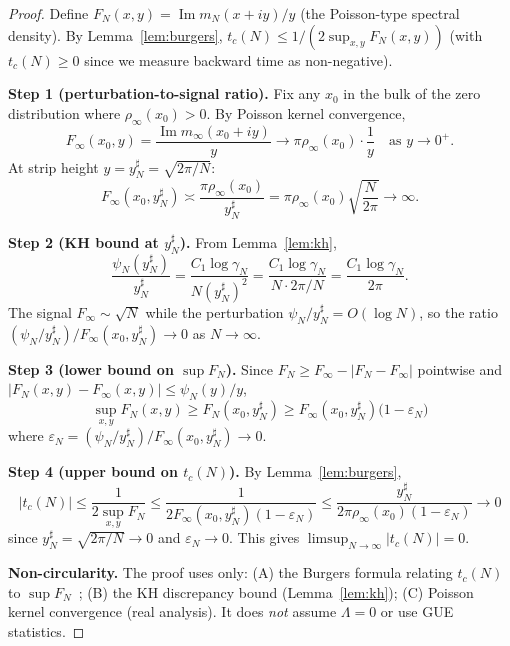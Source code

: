 \documentclass[11pt,reqno]{amsart}
\newcommand{\Lam}{\Lambda}
\newcommand{\tc}{t_c}
\newcommand{\mN}{m_N}
\newcommand{\minf}{m_\infty}
\newcommand{\gN}{\gamma_N}
\newcommand{\yN}{y_N^{\sharp}}
\begin{document}
\begin{proof}
Define $F_N(x,y) = \operatorname{Im}\mN(x+iy)/y$
(the Poisson-type spectral density).
By Lemma~\ref{lem:burgers}, $\tc(N) \leq 1/(2\sup_{x,y} F_N(x,y))$
(with $\tc(N) \geq 0$ since we measure backward time as non-negative).

\textbf{Step 1 (perturbation-to-signal ratio).}
Fix any $x_0$ in the bulk of the zero distribution where $\rho_\infty(x_0) > 0$.
By Poisson kernel convergence,
\begin{equation}
  F_\infty(x_0, y) = \frac{\operatorname{Im}\minf(x_0+iy)}{y}
  \to \pi\rho_\infty(x_0) \cdot \frac{1}{y}
  \quad\text{as }y\to 0^+.
\end{equation}
At strip height $y = \yN = \sqrt{2\pi/N}$:
\begin{equation}\label{eq:Finf}
  F_\infty(x_0, \yN) \asymp \frac{\pi\rho_\infty(x_0)}{\yN}
  = \pi\rho_\infty(x_0)\sqrt{\frac{N}{2\pi}} \to \infty.
\end{equation}

\textbf{Step 2 (KH bound at $\yN$).}
From Lemma~\ref{lem:kh},
\begin{equation}
  \frac{\psi_N(\yN)}{\yN}
  = \frac{C_1\log\gN}{N(\yN)^2}
  = \frac{C_1\log\gN}{N \cdot 2\pi/N}
  = \frac{C_1\log\gN}{2\pi}.
\end{equation}
The signal $F_\infty \sim \sqrt{N}$ while the perturbation $\psi_N/\yN = O(\log N)$,
so the ratio $(\psi_N/\yN)/F_\infty(x_0,\yN) \to 0$ as $N\to\infty$.

\textbf{Step 3 (lower bound on $\sup F_N$).}
Since $F_N \geq F_\infty - |F_N - F_\infty|$ pointwise and
$|F_N(x,y) - F_\infty(x,y)| \leq \psi_N(y)/y$,
\begin{equation}
  \sup_{x,y} F_N(x,y) \geq F_N(x_0,\yN)
  \geq F_\infty(x_0,\yN)\bigl(1 - \varepsilon_N\bigr)
\end{equation}
where $\varepsilon_N = (\psi_N/\yN)/F_\infty(x_0,\yN) \to 0$.

\textbf{Step 4 (upper bound on $\tc(N)$).}
By Lemma~\ref{lem:burgers},
\begin{equation}
  |\tc(N)| \leq \frac{1}{2\sup_{x,y}F_N}
  \leq \frac{1}{2F_\infty(x_0,\yN)(1-\varepsilon_N)}
  \leq \frac{\yN}{2\pi\rho_\infty(x_0)(1-\varepsilon_N)} \to 0
\end{equation}
since $\yN = \sqrt{2\pi/N} \to 0$ and $\varepsilon_N \to 0$.
This gives $\limsup_{N\to\infty}|\tc(N)| = 0$.

\textbf{Non-circularity.}
The proof uses only:
(A) the Burgers formula relating $\tc(N)$ to $\sup F_N$~\cite{polymath15};
(B) the KH discrepancy bound (Lemma~\ref{lem:kh});
(C) Poisson kernel convergence (real analysis).
It does \emph{not} assume $\Lam = 0$ or use GUE statistics.
\end{proof}
\end{document}
